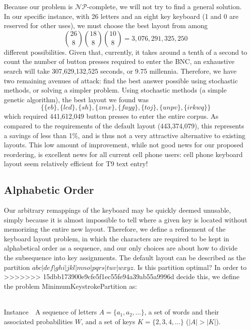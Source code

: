 \documentclass[runningheads]{llncs}
\newcommand{\NP}{\ensuremath{\mathcal{NP}}}
\newcommand{\Instance}{{\sc Instance~}}
\begin{document}
\begin{prob}[{\sc
MinimumKeystrokes}]
Because our problem is \NP-complete, we will not try to find a general solution.  In our specific instance, with 26 letters and an eight key keyboard (1 and 0 are reserved for other uses),  we must choose the best layout from among $$\binom{26}{8} \binom{18}{8} \binom{10}{8} = 3,076,291,325,250$$ different possibilities.  Given that, currently, it takes around a tenth of a second to count the number of button presses required to enter the BNC, an exhaustive search will take 307,629,132,525 seconds, or 9.75 millennia.  Therefore, we have two remaining avenues of attack: find the best answer possible using stochastic methods, or solving a simpler problem.  Using stochastic methods (a simple genetic algorithm), the best layout we found was 
$$\{\{eb\}, \{lcd\}, \{sh\}, \{zmx\}, \{fayg\}, \{toj\}, \{unpv\}, \{irkwq\}\}$$
which required 441,612,049 button presses to enter the entire corpus.   As compared to the requirements of the default layout (443,374,079), this represents a savings of less than 1\%, and is thus not a very attractive alternative to existing layouts.  This low amount of improvement, while not good news for our proposed reordering, is excellent news for all current cell phone users: cell phone keyboard layout seem relatively efficient for T9 text entry!

\subsection{Alphabetic Order}

Our arbitrary remappings of the keyboard may be quickly deemed
unusable, simply because it is almost impossible to tell where a given key is located without memorizing the entire new layout.  Therefore, we define a refinement of the keyboard layout problem, in which the
characters are required to be kept in alphabetical order as a sequence, and our
only choices are about how to divide the subsequence into key assignments.  The
default layout can be described as the partition
$abc|def|ghi|jkl|mno|pqrs|tuv|wxyz$.  Is this partition optimal?  In order to
>>>>>>> 15dbb173900e9cfe5f1ec55fe94a39ab55a9996d
decide this, we define the problem {\sc MinimumKeystrokePartition} as:
\begin{prob}[{\sc MinimumKeystrokePartition}]~\\
\label{thm:minpartition}
\Instance\ A sequence of letters $A = \{a_1, a_2, \ldots \}$, a set of words and their associated probabilities $W$, and a set of keys $K = \{2, 3, 4, \ldots \}$ ($|A| > |K|$).


\end{prob}
\end{prob}
\end{document}
